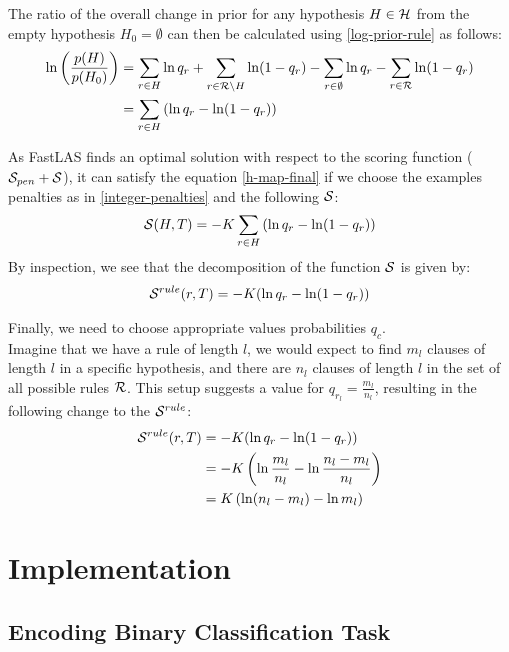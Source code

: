 The ratio of the overall change in prior for any hypothesis $H \in \mathcal{H}$ from the empty hypothesis $H_0 = \emptyset$ can then be calculated using \ref{log-prior-rule} as follows:
\begin{align}
\ln \left(\frac{p(H)}{p(H_0)}\right) 
& = \sum_{r \in H} \ln q_r + \sum_{r \in \mathcal{R}\setminus H} \ln(1-q_r) \nonumber
- \sum_{r \in \emptyset} \ln q_r - \sum_{r \in \mathcal{R}} \ln(1-q_r) \\
& = \sum_{r \in H} \left(\ln q_r - \ln(1-q_r) \right)
\end{align}

As FastLAS finds an optimal solution with respect to the scoring function ($\mathcal{S}_{pen} + \mathcal{S}$), it can satisfy the equation \ref{h-map-final} if we choose the examples penalties as in \ref{integer-penalties} and the following $\mathcal{S}$:
\begin{align}
    \mathcal{S}(H, T) =  -K \sum_{r \in H} \left(\ln q_r - \ln(1-q_r) \right)
\end{align}
By inspection, we see that the decomposition of the function $\mathcal{S}$ is given by:
\begin{align}
    \mathcal{S}^{rule}(r, T) = -K (\ln q_r - \ln(1-q_r))
\end{align}


Finally, we need to choose appropriate values probabilities $q_c$. \\
Imagine that we have a rule of length $l$, we would expect to find $m_l$ clauses of length $l$ in a specific hypothesis, and there are $n_l$ clauses of length $l$ in the set of all possible rules $\mathcal{R}$. 
This setup suggests a value for $q_{r_l} = \frac{m_l}{n_l}$, resulting in the following change to the $\mathcal{S}^{rule}$:
\begin{align}
\mathcal{S}^{rule}(r, T) 
& = -K (\ln q_r - \ln(1-q_r)) \nonumber \\
& = -K \left (\ln \frac{m_l}{n_l} - \ln \frac{n_l - m_l}{n_l} \right) \nonumber \\
& = K \left (\ln (n_l - m_l) - \ln m_l  \right)
\end{align}

\section{Implementation}

\subsection{Encoding Binary Classification Task}

